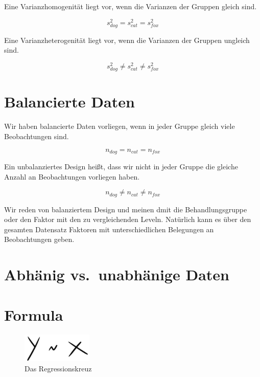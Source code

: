 \documentclass[
  letterpaper,
  DIV=11,
  oneside]{scrreport}
\begin{document}
Eine Varianzhomogenität liegt vor, wenn die Varianzen der Gruppen gleich
sind.

\[
s^2_{dog} = s^2_{cat} = s^2_{fox}
\]

Eine Varianzheterogenität liegt vor, wenn die Varianzen der Gruppen
ungleich sind.

\[
s^2_{dog} \neq s^2_{cat} \neq s^2_{fox}
\]

\hypertarget{balancierte-daten}{%
\section*{Balancierte Daten}\label{balancierte-daten}}

Wir haben balancierte Daten vorliegen, wenn in jeder Gruppe gleich viele
Beobachtungen sind.

\[
n_{dog} = n_{cat} = n_{fox}
\]

Ein unbalanziertes Design heißt, dass wir nicht in jeder Gruppe die
gleiche Anzahl an Beobachtungen vorliegen haben.

\[
n_{dog} \neq n_{cat} \neq n_{fox}
\]

Wir reden von balanziertem Design und meinen dmit die Behandlungsgruppe
oder den Faktor mit den zu vergleichenden Leveln. Natürlich kann es über
den gesamten Datensatz Faktoren mit unterschiedlichen Belegungen an
Beobachtungen geben.

\hypertarget{abhuxe4nig-vs.-unabhuxe4nige-daten}{%
\section*{Abhänig vs.~unabhänige
Daten}\label{abhuxe4nig-vs.-unabhuxe4nige-daten}}

\hypertarget{formula}{%
\section*{Formula}\label{formula}}

\begin{figure}

{\centering \includegraphics[width=0.3\textwidth,height=\textheight]{./images/statistical_modeling_0.png}

}

\caption{\label{fig-reg-model-0}Das Regressionskreuz}

\end{figure}
\end{document}
